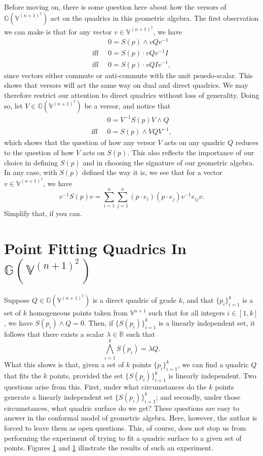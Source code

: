 \documentclass{birkjour}
\theoremstyle{definition}
\theoremstyle{remark}
\numberwithin{equation}{section}
\newcommand{\G}{\mathbb{G}}
\newcommand{\V}{\mathbb{V}}
\newcommand{\R}{\mathbb{R}}
\begin{document}
Before moving on, there is some question here about how the versors
of $\G(\V^{(n+1)^2})$ act on the quadrics in this geometric algebra.
The first observation we can make is that for any vector $v\in\V^{(n+1)^2}$,
we have
\begin{align}
 & 0 = S(p)\wedge vQv^{-1} \\
\mbox{iff}\;\; & 0 = S(p)\cdot vQv^{-1}I \\
\mbox{iff}\;\; & 0 = S(p)\cdot vQIv^{-1},
\end{align}
since vectors either commute or anti-commute with the unit psuedo-scalar.  This shows that
versors will act the same way on dual and direct quadrics.  We may therefore restrict
our attention to direct quadrics without loss of generality.  Doing so, let $V\in\G(\V^{(n+1)^2})$
be a versor, and notice that
\begin{align}
 & 0 = V^{-1}S(p)V\wedge Q \\
\mbox{iff}\;\;& 0 = S(p)\wedge VQV^{-1},
\end{align}
which shows that the question of how any versor $V$ acts on any quadric $Q$ reduces
to the question of how $V$ acts on $S(p)$.  This also reflects the importance of our
choice in defining $S(p)$ and in choosing the signature of our geometric algebra.
In any case, with $S(p)$ defined the way it is, we see that for a vector $v\in\V^{(n+1)^2}$,
we have
\begin{equation}
v^{-1}S(p)v = \sum_{i=1}^n\sum_{j=1}^n(p\cdot e_i)(p\cdot e_j)v^{-1}e_{ij}v.
\end{equation}
Simplify that, if you can.

\section{Point Fitting Quadrics In $\G(\V^{(n+1)^2})$}

Suppose $Q\in\G(\V^{(n+1)^2})$ is a direct quadric of grade $k$, and
that $\{p_i\}_{i=1}^k$ is a set of $k$ homogeneous points taken from $\V^{n+1}$
such that for all integers $i\in[1,k]$, we have $S(p_i)\wedge Q=0$.  Then,
if $\{S(p_i)\}_{i=1}^k$ is a linearly independent set, it follows that
there exists a scalar $\lambda\in\R$ such that
\begin{equation}
\bigwedge_{i=1}^k S(p_i) = \lambda Q.
\end{equation}
What this shows is that, given a set of $k$ points $\{p_i\}_{i=1}^k$, we can find a quadric $Q$
that fits the $k$ points, provided the set $\{S(p_i)\}_{i=1}^k$ is linearly
independent.  Two questions
arise from this.  First, under what circumstances do the $k$ points generate
a linearly independent set $\{S(p_i)\}_{i=1}^k$; and secondly, under
those circumstances, what quadric surface do we get?  These questions
are easy to answer in the conformal model of geometric algebra.  Here, however,
the author is forced to leave them as open questions.  This, of course, does
not stop us from performing the experiment of trying to fit a quadric surface
to a given set of points.  Figures \ref{} and \ref{} illustrate the results
of such an experiment.
\end{document}
